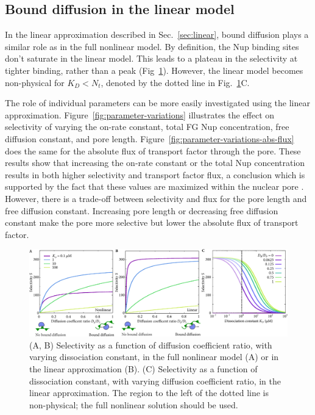 \subsection{Bound diffusion in the linear model}

In the linear approximation described in Sec.~\ref{sec:linear}, bound diffusion plays a similar role as in the full nonlinear model.  By definition, the Nup binding sites don't saturate in the linear model.  This leads to a plateau in the selectivity at tighter binding, rather than a peak (Fig~\ref{fig:linear-selectivity}).  However, the linear model becomes non-physical for $K_D < N_t$, denoted by the dotted line in Fig.~\ref{fig:linear-selectivity}C.

The role of individual parameters can be more easily investigated using the linear approximation.  Figure~\ref{fig:parameter-variations} illustrates the effect on selectivity of varying the on-rate constant, total FG Nup concentration, free diffusion constant, and pore length.  Figure~\ref{fig:parameter-variations-abs-flux} does the same for the absolute flux of transport factor through the pore.  These results show that increasing the on-rate constant or the total Nup concentration results in both higher selectivity and transport factor flux, a conclusion which is supported by the fact that these values are maximized within the nuclear pore \cite{milles15, hough15}.  However, there is a trade-off between selectivity and flux for the pore length and free diffusion constant.  Increasing pore length or decreasing free diffusion constant make the pore more selective but lower the absolute flux of transport factor.

\begin{figure}
\centering
\includegraphics[width=\linewidth]{figs/ch02/linear-selectivity.pdf}
\caption[Selectivity in the linear approximation.]{(A, B) Selectivity as a function of diffusion coefficient
  ratio, with varying dissociation constant, in the full nonlinear
  model (A) or in the linear approximation (B).  (C) Selectivity as a
  function of dissociation constant, with varying diffusion
  coefficient ratio, in the linear approximation.  The region to the
  left of the dotted line is non-physical; the full nonlinear solution
  should be used.}
\label{fig:linear-selectivity}
\end{figure}

